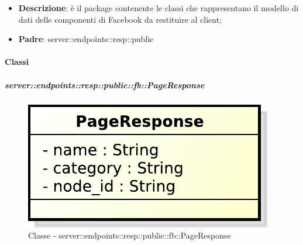 \begin{itemize}
  \item \textbf{Descrizione}: è il package contenente le classi che rappresentano il modello di dati delle componenti di Facebook da restituire al client;
  \item \textbf{Padre}: server::endpoints::resp::public
\end{itemize}

  \paragraph{Classi} %

    \subparagraph{server::endpoints::resp::public::fb::PageResponse} %
    \label{subp:bdsm_app_server_endpoints_resp_public_fb_pageresponse}
  \begin{figure}[!htbp]
    \centering
    \centerline{\includegraphics[scale=0.6]{./images/server/classes/endpoints/fb/page_response.pdf}}
    \caption{Classe - server::endpoints::resp::public::fb::PageResponse}
  \end{figure}
